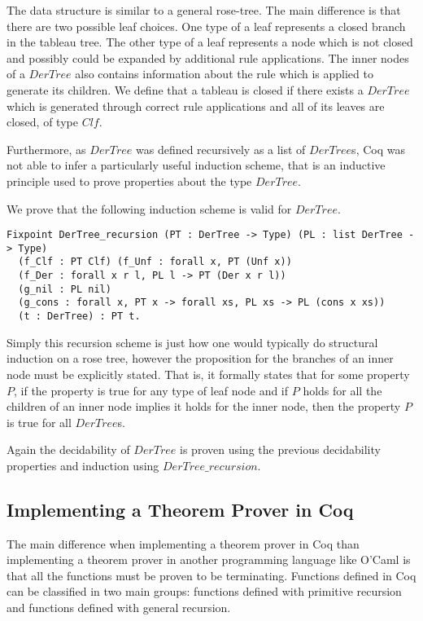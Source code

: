 The data structure is similar to a general rose-tree. The main difference is
that there are two possible leaf choices.  One type of a leaf represents a
closed branch in the tableau tree. The other type of a leaf represents a node
which is not closed and possibly could be expanded by additional rule
applications. The inner nodes of a $DerTree$ also contains information about
the rule which is applied to generate its children. We define that a tableau
is closed if there exists a $DerTree$ which is generated through correct rule
applications and all of its leaves are closed, of type $Clf$.

Furthermore, as $DerTree$ was defined recursively as a list of $DerTree$s, Coq
was not able to infer a particularly useful induction scheme, that is an
inductive principle used to prove properties about the type $DerTree$.

We prove that the following induction scheme is valid for $DerTree$.

\begin{lstlisting}
Fixpoint DerTree_recursion (PT : DerTree -> Type) (PL : list DerTree -> Type)
  (f_Clf : PT Clf) (f_Unf : forall x, PT (Unf x))
  (f_Der : forall x r l, PL l -> PT (Der x r l))
  (g_nil : PL nil)
  (g_cons : forall x, PT x -> forall xs, PL xs -> PL (cons x xs)) 
  (t : DerTree) : PT t.
\end{lstlisting}

Simply this recursion scheme is just how one would typically do structural
induction on a rose tree, however the proposition for the branches of an inner
node must be explicitly stated. That is, it formally states that for some
property $P$, if the property is true for any type of leaf node and if $P$
holds for all the children of an inner node implies it holds for the inner
node, then the property $P$ is true for all $DerTree$s.

Again the decidability of $DerTree$ is proven using the previous
decidability properties and induction using $DerTree\_recursion$.

\subsection{Implementing a Theorem Prover in Coq}

The main difference when implementing a theorem prover in Coq than implementing
a theorem prover in another programming language like O'Caml is that all the
functions must be proven to be terminating. Functions defined in Coq can be
classified in two main groups: functions defined with primitive recursion and
functions defined with general recursion.

